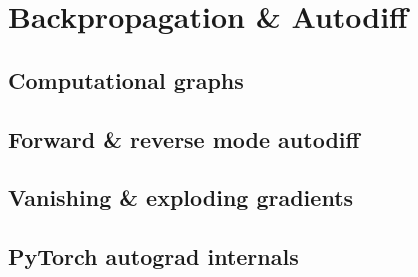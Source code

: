 
\section{Backpropagation \& Autodiff}

\subsection{Computational graphs}


\subsection{Forward \& reverse mode autodiff}


\subsection{Vanishing \& exploding gradients}


\subsection{PyTorch autograd internals}


